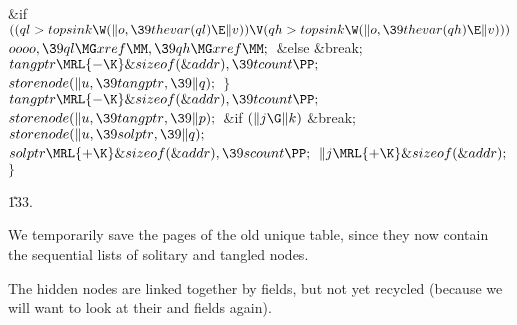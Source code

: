 \&{if} ${}((\\{ql}>\\{topsink}\W(\|o,\39\\{thevar}(\\{ql})\E\|v))\V(\\{qh}>%
\\{topsink}\W(\|o,\39\\{thevar}(\\{qh})\E\|v))){}$\1\5
${}\\{oooo},\39\\{ql}\MG\\{xref}\MM,\39\\{qh}\MG\\{xref}\MM;{}$\2\6
\&{else}\1\5
\&{break};\2\6
${}\\{tangptr}\MRL{-{\K}}\&{sizeof}(\&{addr}),\39\\{tcount}\PP;{}$\6
${}\\{storenode}(\|u,\39\\{tangptr},\39\|q);{}$\6
\4${}\}{}$\2\6
${}\\{tangptr}\MRL{-{\K}}\&{sizeof}(\&{addr}),\39\\{tcount}\PP;{}$\6
${}\\{storenode}(\|u,\39\\{tangptr},\39\|p);{}$\6
\&{if} ${}(\|j\G\|k){}$\1\5
\&{break};\2\6
${}\\{storenode}(\|u,\39\\{solptr},\39\|q);{}$\6
${}\\{solptr}\MRL{+{\K}}\&{sizeof}(\&{addr}),\39\\{scount}\PP;{}$\6
${}\|j\MRL{+{\K}}\&{sizeof}(\&{addr});{}$\6
\4${}\}{}$\2\par
\U133.\fi

We temporarily save the pages of the old unique table, since they
now contain the sequential lists of solitary and tangled nodes.

The hidden nodes are linked together by  fields, but not yet
recycled (because we will want to look at their  and 
fields
again).

